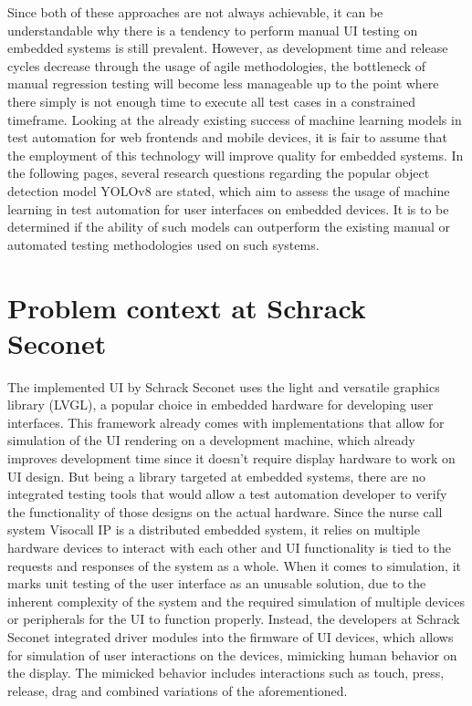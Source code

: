 \documentclass[Proposal,BIC,english,IEEE]{BASE/twbook} %
\begin{document}
Since both of these approaches are not always achievable, it can be understandable why there is a tendency to perform manual UI testing on embedded systems is still prevalent.
However, as development time and release cycles decrease through the usage of agile methodologies, the bottleneck of manual regression testing will become less manageable up to the point where there simply is not enough time to execute all test cases in a constrained timeframe.
Looking at the already existing success of machine learning models in test automation for web frontends and mobile devices, it is fair to assume that the employment of this technology will improve quality for embedded systems. In the following pages, several research questions regarding the popular object detection model YOLOv8 are stated, which aim to assess the usage of machine learning in test automation for user interfaces on embedded devices. It is to be determined if the ability of such models can outperform the existing manual or automated testing methodologies used on such systems.
\section{Problem context at Schrack Seconet}
The implemented UI by Schrack Seconet uses the light and versatile graphics library\autocite{LVGLLightVersatile} (LVGL), a popular choice in embedded hardware for developing user interfaces. This framework already comes with implementations that allow for simulation of the UI rendering on a development machine, which already improves development time since it doesn't require display hardware to work on UI design.
But being a library targeted at embedded systems, there are no integrated testing tools that would allow a test automation developer to verify the functionality of those designs on the actual hardware. Since the nurse call system Visocall IP\autocite{VisocallIPModerne} is a distributed embedded system, it relies on multiple hardware devices to interact with each other and UI functionality is tied to the requests and responses of the system as a whole.
When it comes to simulation, it marks unit testing of the user interface as an unusable solution, due to the inherent complexity of the system and the required simulation of multiple devices or peripherals for the UI to function properly.
Instead, the developers at Schrack Seconet integrated driver modules into the firmware of UI devices, which allows for simulation of user interactions on the devices, mimicking human behavior on the display. The mimicked behavior includes interactions such as touch, press, release, drag and combined variations of the aforementioned.
\end{document}
